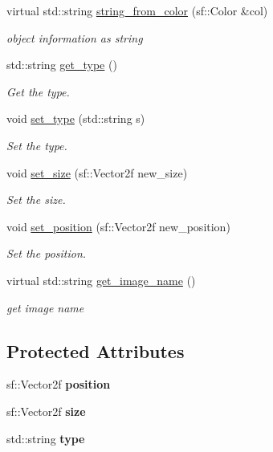 \begin{DoxyCompactItemize}
virtual std\+::string \hyperlink{classdrawable_add3d8569fe2616ae0ed503b19c92c08e}{string\+\_\+from\+\_\+color} (sf\+::\+Color \&col)
\begin{DoxyCompactList}\small\item\em object information as string \end{DoxyCompactList}\item 
std\+::string \hyperlink{classdrawable_a329e564296d591dc8bd2f6dc5a205213}{get\+\_\+type} ()
\begin{DoxyCompactList}\small\item\em Get the type. \end{DoxyCompactList}\item 
void \hyperlink{classdrawable_aa019787b726542ca470fb817251e7b09}{set\+\_\+type} (std\+::string s)
\begin{DoxyCompactList}\small\item\em Set the type. \end{DoxyCompactList}\item 
void \hyperlink{classdrawable_a34b6b50f342c41f550f09e0465f95f61}{set\+\_\+size} (sf\+::\+Vector2f new\+\_\+size)
\begin{DoxyCompactList}\small\item\em Set the size. \end{DoxyCompactList}\item 
void \hyperlink{classdrawable_a5e40f2621daaca4ac32ef26b8c01b9a6}{set\+\_\+position} (sf\+::\+Vector2f new\+\_\+position)
\begin{DoxyCompactList}\small\item\em Set the position. \end{DoxyCompactList}\item 
virtual std\+::string \hyperlink{classdrawable_a59285b12c068ce5e02def707f0b0ee3b}{get\+\_\+image\+\_\+name} ()
\begin{DoxyCompactList}\small\item\em get image name \end{DoxyCompactList}\end{DoxyCompactItemize}
\subsection*{Protected Attributes}
\begin{DoxyCompactItemize}
\item 
\mbox{\label{classdrawable_a34679fa5ae82eee65dfd6b1b9f3c7cb6}} 
sf\+::\+Vector2f {\bfseries position}
\item 
\mbox{\label{classdrawable_aa3900dd7b69b439a3514e6acdb4a17b9}} 
sf\+::\+Vector2f {\bfseries size}
\item 
\mbox{\label{classdrawable_ad5a982912d20a94b0e69de86cc9b53cb}} 
std\+::string {\bfseries type}
\end{DoxyCompactItemize}


